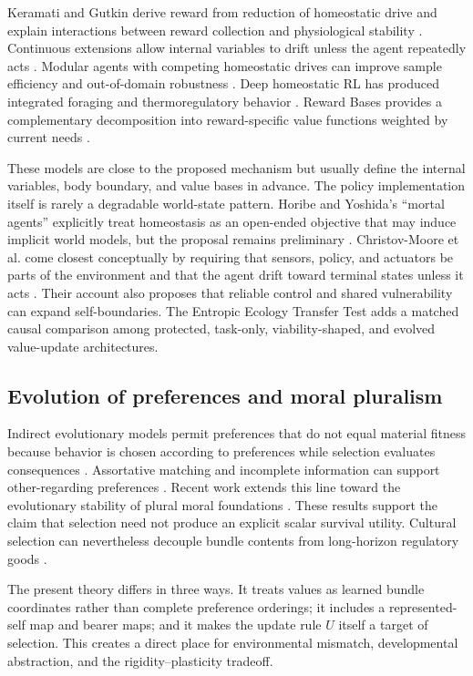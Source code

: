 \documentclass[11pt]{article}
\begin{document}
Keramati and Gutkin derive reward from reduction of homeostatic drive and explain interactions between reward collection and physiological stability \citep{keramati2014}. Continuous extensions allow internal variables to drift unless the agent repeatedly acts \citep{laurencon2021}. Modular agents with competing homeostatic drives can improve sample efficiency and out-of-domain robustness \citep{dulberg2022}. Deep homeostatic RL has produced integrated foraging and thermoregulatory behavior \citep{yoshida2024}. Reward Bases provides a complementary decomposition into reward-specific value functions weighted by current needs \citep{millidge2024}.

These models are close to the proposed mechanism but usually define the internal variables, body boundary, and value bases in advance. The policy implementation itself is rarely a degradable world-state pattern. Horibe and Yoshida's ``mortal agents'' explicitly treat homeostasis as an open-ended objective that may induce implicit world models, but the proposal remains preliminary \citep{horibe2024}. Christov-Moore et al. come closest conceptually by requiring that sensors, policy, and actuators be parts of the environment and that the agent drift toward terminal states unless it acts \citep{christovmoore2026}. Their account also proposes that reliable control and shared vulnerability can expand self-boundaries. The Entropic Ecology Transfer Test adds a matched causal comparison among protected, task-only, viability-shaped, and evolved value-update architectures.

\subsection{Evolution of preferences and moral pluralism}

Indirect evolutionary models permit preferences that do not equal material fitness because behavior is chosen according to preferences while selection evaluates consequences \citep{dekel2007}. Assortative matching and incomplete information can support other-regarding preferences \citep{alger2013}. Recent work extends this line toward the evolutionary stability of plural moral foundations \citep{avataneo2025}. These results support the claim that selection need not produce an explicit scalar survival utility. Cultural selection can nevertheless decouple bundle contents from long-horizon regulatory goods \citep{zarncke2026vbd}.

The present theory differs in three ways. It treats values as learned bundle coordinates rather than complete preference orderings; it includes a represented-self map and bearer maps; and it makes the update rule $U$ itself a target of selection. This creates a direct place for environmental mismatch, developmental abstraction, and the rigidity--plasticity tradeoff.
\end{document}

